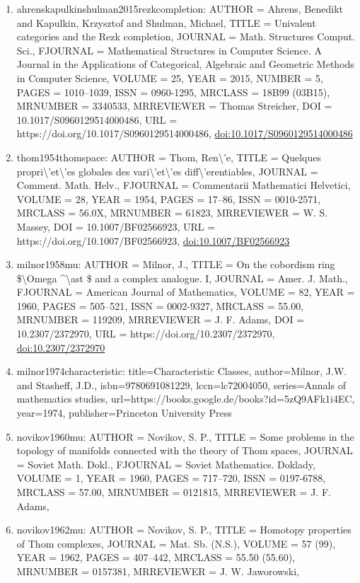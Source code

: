 \documentclass[11pt]{article}
\begin{document}
\begin{enumerate}[leftmargin=*]
  \item ahrenskapulkinshulman2015rezkcompletion: AUTHOR = Ahrens, Benedikt and Kapulkin, Krzysztof and Shulman, Michael, TITLE = Univalent categories and the Rezk completion, JOURNAL = Math. Structures Comput. Sci., FJOURNAL = Mathematical Structures in Computer Science. A Journal in the Applications of Categorical, Algebraic and Geometric Methods in Computer Science, VOLUME = 25, YEAR = 2015, NUMBER = 5, PAGES = 1010--1039, ISSN = 0960-1295, MRCLASS = 18B99 (03B15), MRNUMBER = 3340533, MRREVIEWER = Thomas Streicher, DOI = 10.1017/S0960129514000486, URL = https://doi.org/10.1017/S0960129514000486, \href{https://doi.org/10.1017/S0960129514000486}{doi:10.1017/S0960129514000486}
  \item thom1954thomspace: AUTHOR = Thom, Ren\textbackslash{}'e, TITLE = Quelques propri\textbackslash{}'et\textbackslash{}'es globales des vari\textbackslash{}'et\textbackslash{}'es diff\textbackslash{}'erentiables, JOURNAL = Comment. Math. Helv., FJOURNAL = Commentarii Mathematici Helvetici, VOLUME = 28, YEAR = 1954, PAGES = 17--86, ISSN = 0010-2571, MRCLASS = 56.0X, MRNUMBER = 61823, MRREVIEWER = W. S. Massey, DOI = 10.1007/BF02566923, URL = https://doi.org/10.1007/BF02566923, \href{https://doi.org/10.1007/BF02566923}{doi:10.1007/BF02566923}
  \item milnor1958mu: AUTHOR = Milnor, J., TITLE = On the cobordism ring \$\textbackslash{}Omega \^{}\textbackslash{}ast \$ and a complex analogue. I, JOURNAL = Amer. J. Math., FJOURNAL = American Journal of Mathematics, VOLUME = 82, YEAR = 1960, PAGES = 505--521, ISSN = 0002-9327, MRCLASS = 55.00, MRNUMBER = 119209, MRREVIEWER = J. F. Adams, DOI = 10.2307/2372970, URL = https://doi.org/10.2307/2372970, \href{https://doi.org/10.2307/2372970}{doi:10.2307/2372970}
  \item milnor1974characteristic: title=Characteristic Classes, author=Milnor, J.W. and Stasheff, J.D., isbn=9780691081229, lccn=lc72004050, series=Annals of mathematics studies, url=https://books.google.de/books?id=5zQ9AFk1i4EC, year=1974, publisher=Princeton University Press
  \item novikov1960mu: AUTHOR = Novikov, S. P., TITLE = Some problems in the topology of manifolds connected with the theory of Thom spaces, JOURNAL = Soviet Math. Dokl., FJOURNAL = Soviet Mathematics. Doklady, VOLUME = 1, YEAR = 1960, PAGES = 717--720, ISSN = 0197-6788, MRCLASS = 57.00, MRNUMBER = 0121815, MRREVIEWER = J. F. Adams,
  \item novikov1962mu: AUTHOR = Novikov, S. P., TITLE = Homotopy properties of Thom complexes, JOURNAL = Mat. Sb. (N.S.), VOLUME = 57 (99), YEAR = 1962, PAGES = 407--442, MRCLASS = 55.50 (55.60), MRNUMBER = 0157381, MRREVIEWER = J. W. Jaworowski,

\end{enumerate}
\end{document}
